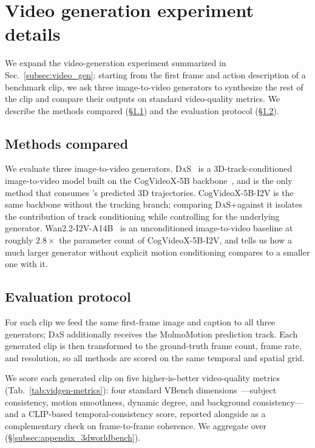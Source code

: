 \section{Video generation experiment details}
\label{appsec:vidgen}

We expand the video-generation experiment summarized in Sec.~\ref{subsec:video_gen}: starting from the first frame and action description of a benchmark clip, we ask three image-to-video generators to synthesize the rest of the clip and compare their outputs on standard video-quality metrics. We describe the methods compared (\S\ref{appsec:vidgen_methods}) and the evaluation protocol (\S\ref{appsec:vidgen_eval}).

\subsection{Methods compared}
\label{appsec:vidgen_methods}

We evaluate three image-to-video generators. \textsc{DaS}~\cite{gu2025diffusionasshader} is a 3D-track-conditioned image-to-video model built on the CogVideoX-5B backbone~\cite{yang2025cogvideoxtexttovideodiffusionmodels}, and is the only method that consumes \modelname's predicted 3D trajectories. CogVideoX-5B-I2V is the same backbone without the tracking branch; comparing \textsc{DaS}+\modelname against it isolates the contribution of track conditioning while controlling for the underlying generator. Wan2.2-I2V-A14B~\cite{wan22} is an unconditioned image-to-video baseline at roughly $2.8\times$ the parameter count of CogVideoX-5B-I2V, and tells us how a much larger generator without explicit motion conditioning compares to a smaller one with it.


\subsection{Evaluation protocol}
\label{appsec:vidgen_eval}

For each clip we feed the same first-frame image and caption to all three generators; \textsc{DaS} additionally receives the MolmoMotion prediction track. Each generated clip is then transformed to the ground-truth frame count, frame rate, and resolution, so all methods are scored on the same temporal and spatial grid.

We score each generated clip on five higher-is-better video-quality metrics (Tab.~\ref{tab:vidgen-metrics}): four standard VBench dimensions~\cite{huang2023vbench}---subject consistency, motion smoothness, dynamic degree, and background consistency---and a CLIP-based temporal-consistency score, reported alongside as a complementary check on frame-to-frame coherence. We aggregate over \benchmarkname{} (\S\ref{subsec:appendix_3dworldbench}).
